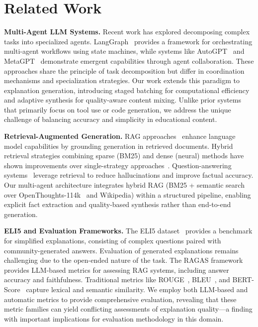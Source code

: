 \section{Related Work}

\textbf{Multi-Agent LLM Systems.}
Recent work has explored decomposing complex tasks into specialized agents. LangGraph~\cite{langgraph} provides a framework for orchestrating multi-agent workflows using state machines, while systems like AutoGPT~\cite{autogpt} and MetaGPT~\cite{metagpt} demonstrate emergent capabilities through agent collaboration. These approaches share the principle of task decomposition but differ in coordination mechanisms and specialization strategies. Our work extends this paradigm to explanation generation, introducing staged batching for computational efficiency and adaptive synthesis for quality-aware content mixing. Unlike prior systems that primarily focus on tool use or code generation, we address the unique challenge of balancing accuracy and simplicity in educational content.

\textbf{Retrieval-Augmented Generation.}
RAG approaches~\cite{lewis2020rag} enhance language model capabilities by grounding generation in retrieved documents. Hybrid retrieval strategies combining sparse (BM25) and dense (neural) methods have shown improvements over single-strategy approaches~\cite{ma2021hybrid}. Question-answering systems~\cite{izacard2021fid} leverage retrieval to reduce hallucinations and improve factual accuracy. Our multi-agent architecture integrates hybrid RAG (BM25 + semantic search over OpenThoughts-114k~\cite{openthoughts} and Wikipedia) within a structured pipeline, enabling explicit fact extraction and quality-based synthesis rather than end-to-end generation.

\textbf{ELI5 and Evaluation Frameworks.}
The ELI5 dataset~\cite{fan2019eli5} provides a benchmark for simplified explanations, consisting of complex questions paired with community-generated answers. Evaluation of generated explanations remains challenging due to the open-ended nature of the task. The RAGAS framework~\cite{ragas} provides LLM-based metrics for assessing RAG systems, including answer accuracy and faithfulness. Traditional metrics like ROUGE~\cite{lin2004rouge}, BLEU~\cite{papineni2002bleu}, and BERT-Score~\cite{zhang2020bertscore} capture lexical and semantic similarity. We employ both LLM-based and automatic metrics to provide comprehensive evaluation, revealing that these metric families can yield conflicting assessments of explanation quality---a finding with important implications for evaluation methodology in this domain.

